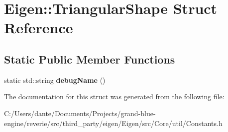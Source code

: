 \hypertarget{struct_eigen_1_1_triangular_shape}{}\section{Eigen\+::Triangular\+Shape Struct Reference}
\label{struct_eigen_1_1_triangular_shape}
\subsection*{Static Public Member Functions}
\begin{DoxyCompactItemize}
\item 
\mbox{\label{struct_eigen_1_1_triangular_shape_a6c43155ceddf7ca3176df0976fb531db}} 
static std\+::string {\bfseries debug\+Name} ()
\end{DoxyCompactItemize}


The documentation for this struct was generated from the following file\+:\begin{DoxyCompactItemize}
\item 
C\+:/\+Users/dante/\+Documents/\+Projects/grand-\/blue-\/engine/reverie/src/third\+\_\+party/eigen/\+Eigen/src/\+Core/util/Constants.\+h\end{DoxyCompactItemize}
